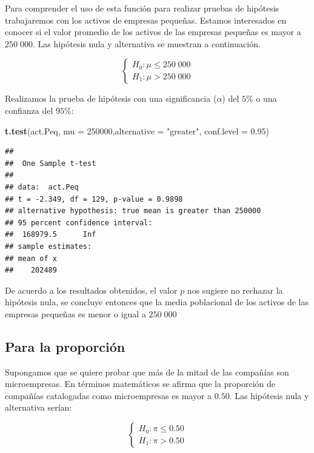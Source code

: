 \documentclass[letterpaper,]{book}
\newenvironment{Shaded}{\begin{snugshade}}{\end{snugshade}}
\newcommand{\DataTypeTok}[1]{\textcolor[rgb]{0.13,0.29,0.53}{#1}}
\newcommand{\DecValTok}[1]{\textcolor[rgb]{0.00,0.00,0.81}{#1}}
\newcommand{\FloatTok}[1]{\textcolor[rgb]{0.00,0.00,0.81}{#1}}
\newcommand{\KeywordTok}[1]{\textcolor[rgb]{0.13,0.29,0.53}{\textbf{#1}}}
\newcommand{\NormalTok}[1]{#1}
\newcommand{\StringTok}[1]{\textcolor[rgb]{0.31,0.60,0.02}{#1}}
\begin{document}
Para comprender el uso de esta función para realizar pruebas de hipótesis trabajaremos con los activos de empresas pequeñas. Estamos interesados en conocer si el valor promedio de los activos de las empresas pequeñas es mayor a \(250\;000\). Las hipótesis nula y alternativa se muestran a continuación.

\begin{equation} 
\begin{cases} 
H_0: \mu \leq 250\;000 \\ 
H_1: \mu > 250\;000
\end{cases} 
\end{equation}

Realizamos la prueba de hipótesis con una significancia (\(\alpha\)) del \(5\%\) o una confianza del \(95\%\):

\begin{Shaded}
\begin{Highlighting}[]
\KeywordTok{t.test}\NormalTok{(act.Peq, }\DataTypeTok{mu =} \DecValTok{250000}\NormalTok{,}\DataTypeTok{alternative =} \StringTok{"greater"}\NormalTok{,  }\DataTypeTok{conf.level =} \FloatTok{0.95}\NormalTok{)}
\end{Highlighting}
\end{Shaded}

\begin{verbatim}
## 
##  One Sample t-test
## 
## data:  act.Peq
## t = -2.349, df = 129, p-value = 0.9898
## alternative hypothesis: true mean is greater than 250000
## 95 percent confidence interval:
##  168979.5      Inf
## sample estimates:
## mean of x 
##    202489
\end{verbatim}

De acuerdo a los resultados obtenidos, el valor \(p\) nos sugiere no rechazar la hipótesis nula, se concluye entonces que la media poblacional de los activos de las empresas pequeñas es menor o igual a \(250\;000\)

\hypertarget{para-la-proporcion-1}{%
\subsection{Para la proporción}\label{para-la-proporcion-1}}

Supongamos que se quiere probar que más de la mitad de las compañías son microempresas. En términos matemáticos se afirma que la proporción de compañías catalogadas como microempresas es mayor a \(0.50\). Las hipótesis nula y alternativa serían:

\begin{equation} 
\begin{cases} 
H_0: \pi \leq 0.50 \\ 
H_1: \pi > 0.50
\end{cases} 
\end{equation}
\end{document}
